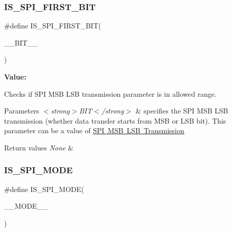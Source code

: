 \subsubsection{\texorpdfstring{IS\_SPI\_FIRST\_BIT}{IS\_SPI\_FIRST\_BIT}}
{\footnotesize\ttfamily \#define I\+S\+\_\+\+S\+P\+I\+\_\+\+F\+I\+R\+S\+T\+\_\+\+B\+IT(\begin{DoxyParamCaption}\item[{}]{\+\_\+\+\_\+\+B\+I\+T\+\_\+\+\_\+ }\end{DoxyParamCaption})}

{\bfseries Value\+:}
\begin{DoxyCode}{0}

\end{DoxyCode}


Checks if S\+PI M\+SB L\+SB transmission parameter is in allowed range. 


\begin{DoxyParams}{Parameters}
{\em $<$strong$>$\+B\+I\+T$<$/strong$>$} & specifies the S\+PI M\+SB L\+SB transmission (whether data transfer starts from M\+SB or L\+SB bit). This parameter can be a value of \mbox{\hyperlink{group___s_p_i___m_s_b___l_s_b__transmission}{S\+PI M\+SB L\+SB Transmission}} \\
\hline
\end{DoxyParams}

\begin{DoxyRetVals}{Return values}
{\em None} & \\
\hline
\end{DoxyRetVals}
\mbox{\label{group___s_p_i___private___macros_ga3dd95189a3729f12ca354b757519ca01}} 
\subsubsection{\texorpdfstring{IS\_SPI\_MODE}{IS\_SPI\_MODE}}
{\footnotesize\ttfamily \#define I\+S\+\_\+\+S\+P\+I\+\_\+\+M\+O\+DE(\begin{DoxyParamCaption}\item[{}]{\+\_\+\+\_\+\+M\+O\+D\+E\+\_\+\+\_\+ }\end{DoxyParamCaption})}

